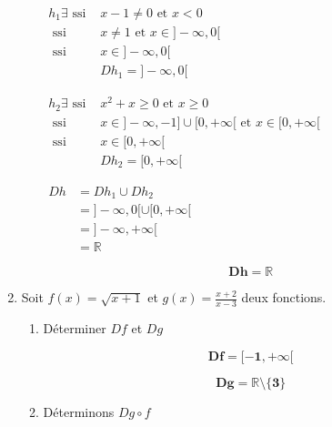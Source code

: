 \documentclass[12pt,a4paper]{article}
\begin{document}
\begin{enumerate}
\begin{enumerate}
										\(
                    \begin{aligned}
                    	 h_{1} \exists \text{ ssi }&  x - 1 \neq 0  \text{ et }  x < 0 \\
                    								  \text{ ssi }&			 x \neq 1  \text{ et }  x\in]-\infty,0[ \\
                    								  \text{ ssi }&			 x\in]-\infty,0[\\
                    								  						&      Dh_{1} = ]-\infty,0[ 
                    \end{aligned}
										\)
										
\(
\begin{aligned}
h_{2} \exists \text{ ssi }&  x^2 + x \geq 0  \text{ et }  x \geq 0 \\
\text{ ssi }& x \in ]-\infty,-1] \cup [0,+\infty[  \text{ et }  x\in[0,+\infty[ \\
\text{ ssi }&	x\in[0,+\infty[\\
& Dh_{2} = [0,+\infty[ 
\end{aligned}
\)			
						
\(
						\begin{aligned} 
						Dh&=Dh_{1} \cup Dh_{2}\\
						  &= ]-\infty,0[ \cup [0,+\infty[\\
						  &= ]-\infty,+\infty[ \\
						  &=\mathbb{R} 
						 \end{aligned}
\)	

                    \begin{resultbox}
                        \[
                            \mathbf{Dh=\mathbb{R} }
                        \]
                    \end{resultbox}										
\end{enumerate}
    \item Soit \( f(x) = \sqrt{x + 1} \) et \( g(x) = \frac{x + 2}{x - 3} \) deux fonctions.
          \begin{enumerate}
              \item Déterminer \( Df \) et \( Dg \)
                   \begin{resultbox}
                        \[
                            \mathbf{Df= [-1,+\infty[ }
                        \]
                    \end{resultbox}
                     \begin{resultbox}
                        \[
                            \mathbf{Dg=\mathbb{R}\setminus\{ 3 \} }
                        \]
                    \end{resultbox}
              \item Déterminons \( Dg \circ f \)
              

\end{enumerate}
\end{enumerate}
\end{document}

